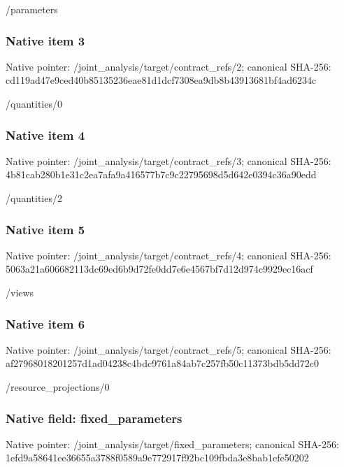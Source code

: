 \documentclass[10pt,a4paper]{article}
\begin{document}
\begingroup\raggedright\sloppy /\allowbreak{}parameters\par\endgroup

\subsubsection{Native item 3}
Native pointer: /joint\_\allowbreak{}analysis/target/contract\_\allowbreak{}refs/2; canonical SHA-256: cd119ad47e9ced40b85135236eae81d1dcf7308ea9db8b43913681bf4ad6234c

\begingroup\raggedright\sloppy /\allowbreak{}quantities/\allowbreak{}0\par\endgroup

\subsubsection{Native item 4}
Native pointer: /joint\_\allowbreak{}analysis/target/contract\_\allowbreak{}refs/3; canonical SHA-256: 4b81cab280b1e31c2ea7afa9a416577b7c9c22795698d5d642e0394c36a90edd

\begingroup\raggedright\sloppy /\allowbreak{}quantities/\allowbreak{}2\par\endgroup

\subsubsection{Native item 5}
Native pointer: /joint\_\allowbreak{}analysis/target/contract\_\allowbreak{}refs/4; canonical SHA-256: 5063a21a606682113dc69ed6b9d72fe0dd7e6e4567bf7d12d974c9929ec16acf

\begingroup\raggedright\sloppy /\allowbreak{}views\par\endgroup

\subsubsection{Native item 6}
Native pointer: /joint\_\allowbreak{}analysis/target/contract\_\allowbreak{}refs/5; canonical SHA-256: af27968018201257d1ad04238c4bdc9761a84ab7c257fb50c11373bdb5dd72c0

\begingroup\raggedright\sloppy /\allowbreak{}resource\_\allowbreak{}projections/\allowbreak{}0\par\endgroup

\subsubsection{Native field: fixed\_\allowbreak{}parameters}
Native pointer: /joint\_\allowbreak{}analysis/target/fixed\_\allowbreak{}parameters; canonical SHA-256: 1efd9a58641ee36655a3788f0589a9e772917f92bc109fbda3e8bab1efe50202
\end{document}
